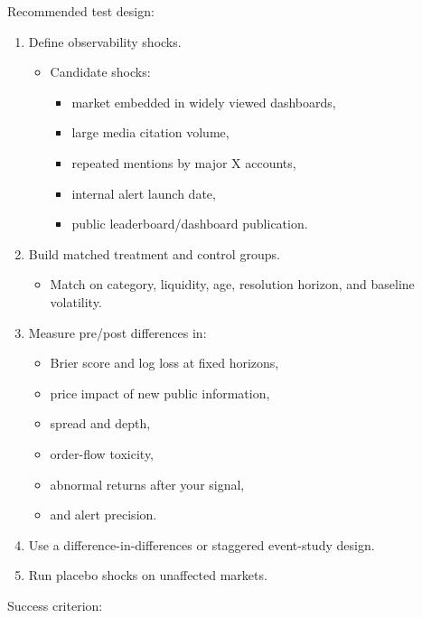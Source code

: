 \documentclass[
]{article}
\providecommand{\tightlist}{%
  \setlength{\itemsep}{0pt}\setlength{\parskip}{0pt}}
\begin{document}
Recommended test design:

\begin{enumerate}
\def\labelenumi{\arabic{enumi}.}
\item
  Define observability shocks.

  \begin{itemize}
  \tightlist
  \item
    Candidate shocks:

    \begin{itemize}
    \tightlist
    \item
      market embedded in widely viewed dashboards,
    \item
      large media citation volume,
    \item
      repeated mentions by major X accounts,
    \item
      internal alert launch date,
    \item
      public leaderboard/dashboard publication.
    \end{itemize}
  \end{itemize}
\item
  Build matched treatment and control groups.

  \begin{itemize}
  \tightlist
  \item
    Match on category, liquidity, age, resolution horizon, and baseline
    volatility.
  \end{itemize}
\item
  Measure pre/post differences in:

  \begin{itemize}
  \tightlist
  \item
    Brier score and log loss at fixed horizons,
  \item
    price impact of new public information,
  \item
    spread and depth,
  \item
    order-flow toxicity,
  \item
    abnormal returns after your signal,
  \item
    and alert precision.
  \end{itemize}
\item
  Use a difference-in-differences or staggered event-study design.
\item
  Run placebo shocks on unaffected markets.
\end{enumerate}

Success criterion:
\end{document}
